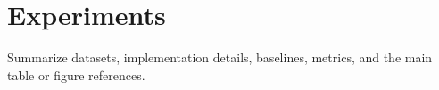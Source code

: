 \section{Experiments}

Summarize datasets, implementation details, baselines, metrics, and the main table or figure references.

